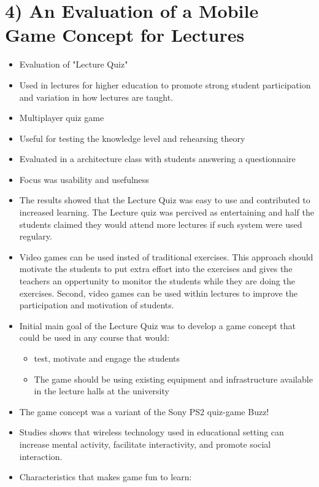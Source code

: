 \chapter*{4) An Evaluation of a Mobile Game Concept for Lectures}

  \begin{itemize}
    \item Evaluation of "Lecture Quiz"
    \item Used in lectures for higher education to promote strong student participation and variation in how lectures are taught.
    \item Multiplayer quiz game
    \item Useful for testing the knowledge level and rehearsing theory
    \item Evaluated in a architecture class with students answering a questionnaire
    \item Focus was usability and usefulness
    \item The results showed that the Lecture Quiz was easy to use and contributed to increased learning. The Lecture quiz was percived as entertaining and half the students claimed they would attend more lectures if such system were used regulary. 
    \item Video games can be used insted of traditional exercises. This approach should motivate the students to put extra effort into the exercises and gives the teachers an oppertunity to monitor the students while they are doing the exercises. Second, video games can be used within lectures to improve the participation and motivation of students. 
    \item Initial main goal of the Lecture Quiz was to develop a game concept that could be used in any course that would: 
      \begin{itemize}
          \item test, motivate and engage the students
          \item The game should be using existing equipment and infrastructure available in the lecture halls at the university
      \end{itemize} 
    \item The game concept was a variant of the Sony PS2 quiz-game Buzz!
    \item Studies shows that wireless technology used in educational setting can increase mental activity, facilitate interactivity, and promote social interaction. 
    \item Characteristics that makes game fun to learn: 

\end{itemize}
